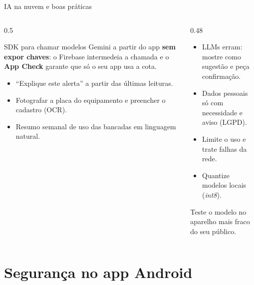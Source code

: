 \documentclass[aspectratio=169,10pt]{beamer}
\begin{document}
\begin{frame}{IA na nuvem e boas práticas}
  \begin{columns}[T]
    \begin{column}{0.5\textwidth}
      \begin{conceito}
        SDK para chamar modelos Gemini a partir do app \textbf{sem expor chaves}: o Firebase intermedeia a chamada e o \textbf{App Check} garante que só o seu app usa a cota.
      \end{conceito}
      \begin{exemplo}
        \begin{itemize}
          \item ``Explique este alerta'' a partir das últimas leituras.
          \item Fotografar a placa do equipamento e preencher o cadastro (OCR).
          \item Resumo semanal de uso das bancadas em linguagem natural.
        \end{itemize}
      \end{exemplo}
    \end{column}
    \begin{column}{0.48\textwidth}
      \begin{atencao}[Cuidados]
        \begin{itemize}
          \item LLMs erram: mostre como sugestão e peça confirmação.
          \item Dados pessoais só com necessidade e aviso (LGPD).
          \item Limite o uso e trate falhas da rede.
          \item Quantize modelos locais (\emph{int8}).
        \end{itemize}
      \end{atencao}
      \begin{dica}
        Teste o modelo no aparelho mais fraco do seu público.
      \end{dica}
    \end{column}
  \end{columns}
\end{frame}

\section{Segurança no app Android}
\end{document}
